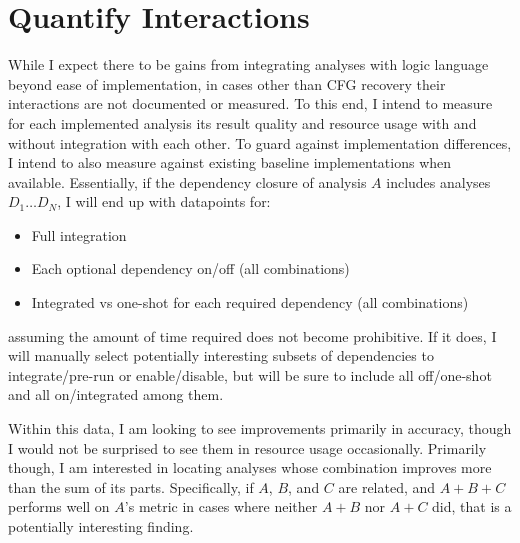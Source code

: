 \section{Quantify Interactions}
While I expect there to be gains from integrating analyses with logic language beyond ease of implementation, in cases other than CFG recovery\cite{jakstab} their interactions are not documented or measured.
To this end, I intend to measure for each implemented analysis its result quality and resource usage with and without integration with each other.
To guard against implementation differences, I intend to also measure against existing baseline implementations when available.
Essentially, if the dependency closure of analysis $A$ includes analyses $D_1 \ldots D_N$, I will  end up with datapoints for:
\begin{itemize}
        \item Full integration
        \item Each optional dependency on/off (all combinations)
        \item Integrated vs one-shot for each required dependency (all combinations)
\end{itemize}
assuming the amount of time required does not become prohibitive.
If it does, I will manually select potentially interesting subsets of dependencies to integrate/pre-run or enable/disable, but will be sure to include all off/one-shot and all on/integrated among them.

Within this data, I am looking to see improvements primarily in accuracy, though I would not be surprised to see them in resource usage occasionally.
Primarily though, I am interested in locating analyses whose combination improves more than the sum of its parts.
Specifically, if $A$, $B$, and $C$ are related, and $A + B + C$ performs well on $A$'s metric in cases where neither $A + B$ nor $A + C$ did, that is a potentially interesting finding.
